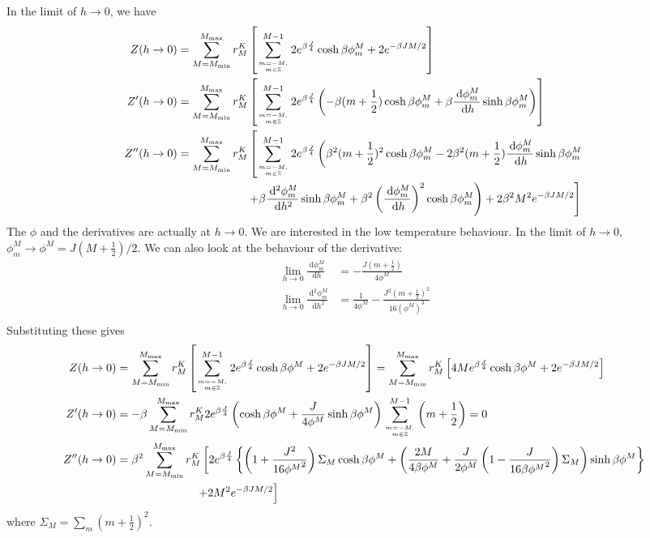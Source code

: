 \documentclass[12pt]{revtex4-2}
\begin{document}
In the limit of \(h \to 0\), we  have
\begin{align}
	     Z(h \to 0) &=\sum_{M=M_\text{min}}^{M_\text{max}}r^K_M\left[\sum_{m=-M, \atop{m\in \mathbb{Z}}}^{M-1}2e^{\beta \frac{J}{4}}\cosh \beta\phi^M_m + 2e^{-\beta JM/2}\right]\\
	Z^\prime(h \to 0) &=\sum_{M=M_\text{min}}^{M_\text{max}}r^K_M\left[\sum_{m=-M, \atop{m\in \mathbb{Z}}}^{M-1}2e^{\beta \frac{J}{4}}\left(-\beta (m+\frac{1}{2}) \cosh \beta\phi^M_m + \beta\frac{\:\mathrm{d}\phi^M_m}{\:\mathrm{d}h}\sinh \beta\phi^M_m\right)\right]\\
	Z^{\prime\prime}(h \to 0) &=\sum_{M=M_\text{min}}^{M_\text{max}}r^K_M\left[\sum_{m=-M, \atop{m\in \mathbb{Z}}}^{M-1}2 e^{\beta \frac{J}{4}}\left(\beta^2 (m+\frac{1}{2})^2 \cosh \beta\phi^M_m - 2\beta^2 (m+\frac{1}{2})\frac{\:\mathrm{d}\phi^M_m}{\:\mathrm{d}h}\sinh \beta\phi^M_m\right.\right.\\
			    &\quad\quad\quad\quad\quad\quad\left.\left. + \beta\frac{\:\mathrm{d^2}\phi^M_m}{\:\mathrm{d}h^2}\sinh \beta\phi^M_m + \beta^2\left(\frac{\:\mathrm{d}\phi^M_m}{\:\mathrm{d}h}\right)^2 \cosh \beta\phi^M_m\right) + 2\beta^2 M^2 e^{-\beta JM/2}\right]\\
\end{align}
The \(\phi\) and the derivatives are actually at \(h\to 0\). We are interested in the low temperature behaviour. In the limit of \(h \to 0\), \(\phi_m^M \to \phi^M = J(M+\frac{1}{2})/2\). We can also look at the behaviour of the derivative:
\begin{align}
	\lim_{h \to 0}\frac{\:\mathrm{d}\phi_m^M}{\:\mathrm{d}h} &= -\frac{J(m+\frac{1}{2})}{4\phi^M}\\
	\lim_{h \to 0}\frac{\:\mathrm{d}^2\phi_m^M}{\:\mathrm{d}h^2} &= \frac{1}{4\phi^M} - \frac{J^2(m + \frac{1}{2})^2}{16\left(\phi^M\right)^3}\\
\end{align}
Substituting these gives
\begin{align}
	     Z(h \to 0) &=\sum_{M=M_\text{min}}^{M_\text{max}}r^K_M\left[\sum_{m=-M, \atop{m\in \mathbb{Z}}}^{M-1}2e^{\beta \frac{J}{4}}\cosh \beta\phi^M + 2e^{-\beta JM/2}\right] = \sum_{M=M_\text{min}}^{M_\text{max}}r^K_M\left[4Me^{\beta \frac{J}{4}}\cosh \beta\phi^M + 2e^{-\beta JM/2}\right]\\
	Z^\prime(h \to 0) &=-\beta\sum_{M=M_\text{min}}^{M_\text{max}}r^K_M2e^{\beta \frac{J}{4}} \left(\cosh \beta\phi^M + \frac{J}{4\phi^M}\sinh \beta\phi^M\right)\sum_{m=-M, \atop{m\in \mathbb{Z}}}^{M-1}\left( m + \frac{1}{2} \right) = 0\\
Z^{\prime\prime}(h \to 0) &=\beta^2\sum_{M=M_\text{min}}^{M_\text{max}}r^K_M\left[2 e^{\beta \frac{J}{4}}\left\{\left(1 + \frac{J^2}{16{\phi^M}^2}\right) \Sigma_M \cosh \beta\phi^M + \left(\frac{2M}{4\beta\phi^M} + \frac{J}{2\phi^M}\left(1 - \frac{J}{16\beta{\phi^M}^2}\right)\Sigma_M \right) \sinh \beta\phi^M\right\} \right.\\
			  &\quad\quad\quad\quad\quad\quad\quad\left.+ 2 M^2 e^{-\beta JM/2}\right]\\
\end{align}
where \(\Sigma_M = \sum_m (m+\frac{1}{2})^2\).
\end{document}
